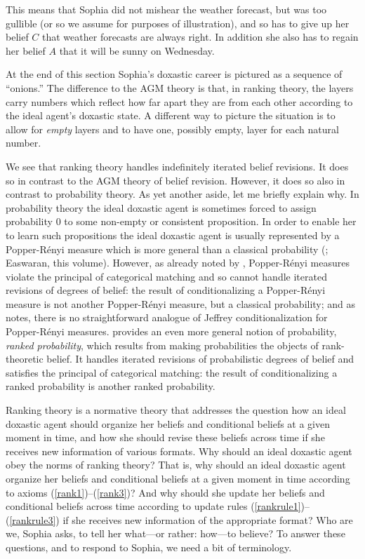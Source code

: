 This means that Sophia did not mishear the weather forecast, but was too gullible (or so we assume for purposes of illustration), and so has to give up her belief $C$ that weather forecasts are always right. In addition she also has to regain her belief $A$ that it will be sunny on Wednesday.

At the end of this section Sophia's doxastic career is pictured as a sequence of ``onions.'' The difference to the AGM theory is that, in ranking theory, the layers carry numbers which reflect how far apart they are from each other according to the ideal agent's doxastic state. A different way to picture the situation is to allow for \emph{empty} layers and to have one, possibly empty, layer for each natural number.

We see that ranking theory handles indefinitely iterated belief revisions. It does so in contrast to the AGM theory of belief revision. However, it does so also in contrast to probability theory. As yet another aside, let me briefly explain why. In probability theory the ideal doxastic agent is sometimes forced to assign probability $0$ to some non-empty or consistent proposition. In order to enable her to learn such propositions the ideal doxastic agent is usually represented by a Popper-R\'enyi measure which is more general than a classical probability (\citealp{p55, r55, s70, s86}; Easwaran, this volume). However, as already noted by \citet{h76a}, Popper-R\'enyi measures violate the principal of categorical matching and so cannot handle iterated revisions of degrees of belief: the result of conditionalizing a Popper-R\'enyi measure is not another Popper-R\'enyi measure, but a classical probability; and as \citet{b95} notes, there is no straightforward analogue of Jeffrey conditionalization for Popper-R\'enyi measures. \citet{s06a} provides an even more general notion of probability, \emph{ranked probability}, which results from making probabilities the objects of rank-theoretic belief. It handles iterated revisions of probabilistic degrees of belief and satisfies the principal of categorical matching: the result of conditionalizing a ranked probability is another ranked probability.

Ranking theory is a normative theory that addresses the question how an ideal doxastic agent should organize her beliefs and conditional beliefs at a given moment in time, and how she should revise these beliefs across time if she receives new information of various formats. Why should an ideal doxastic agent obey the norms of ranking theory? That is, why should an ideal doxastic agent organize her beliefs and conditional beliefs at a given moment in time according to axioms (\ref{rank1})--(\ref{rank3})? And why should she update her beliefs and conditional beliefs across time according to update rules (\ref{rankrule1})--(\ref{rankrule3}) if she receives new information of the appropriate format? Who are we, Sophia asks, to tell her what---or rather: how---to believe? To answer these questions, and to respond to Sophia, we need a bit of terminology.

